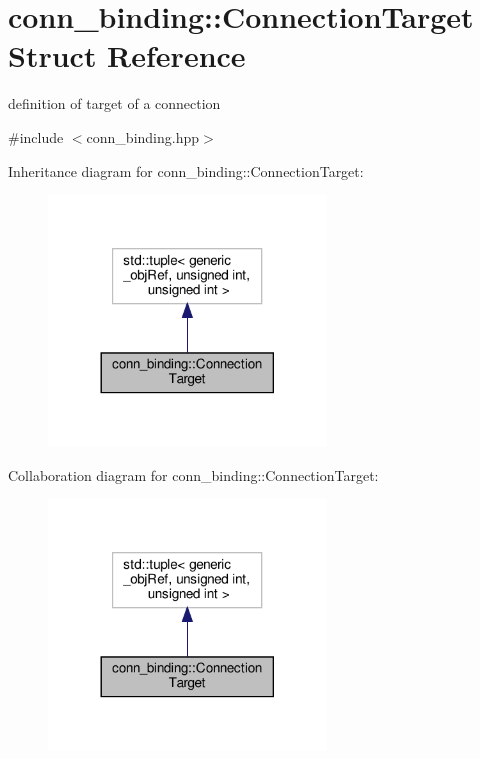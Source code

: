 \hypertarget{structconn__binding_1_1ConnectionTarget}{}\section{conn\+\_\+binding\+:\+:Connection\+Target Struct Reference}
\label{structconn__binding_1_1ConnectionTarget}


definition of target of a connection  




{\ttfamily \#include $<$conn\+\_\+binding.\+hpp$>$}



Inheritance diagram for conn\+\_\+binding\+:\+:Connection\+Target\+:
\nopagebreak
\begin{figure}[H]
\begin{center}
\leavevmode
\includegraphics[width=209pt]{de/d6b/structconn__binding_1_1ConnectionTarget__inherit__graph}
\end{center}
\end{figure}


Collaboration diagram for conn\+\_\+binding\+:\+:Connection\+Target\+:
\nopagebreak
\begin{figure}[H]
\begin{center}
\leavevmode
\includegraphics[width=209pt]{df/db6/structconn__binding_1_1ConnectionTarget__coll__graph}
\end{center}
\end{figure}
